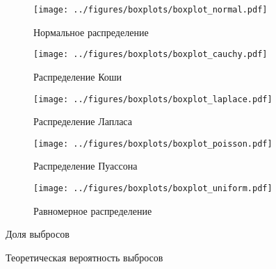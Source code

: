 \documentclass[12pt]{report}
\begin{document}
	\begin{figure}[H]
		\centering
		\texttt{[image: ../figures/boxplots/boxplot\_normal.pdf]}
		\caption{Нормальное распределение}
	\end{figure}
	\begin{figure}[H]
		\centering
		\texttt{[image: ../figures/boxplots/boxplot\_cauchy.pdf]}
		\caption{Распределение Коши}
	\end{figure}
	\begin{figure}[H]
		\centering
		\texttt{[image: ../figures/boxplots/boxplot\_laplace.pdf]}
		\caption{Распределение Лапласа}
	\end{figure}
	\begin{figure}[H]
		\centering
		\texttt{[image: ../figures/boxplots/boxplot\_poisson.pdf]}
		\caption{Распределение Пуассона}
	\end{figure}
	\begin{figure}[H]
		\centering
		\texttt{[image: ../figures/boxplots/boxplot\_uniform.pdf]}
		\caption{Равномерное распределение}
	\end{figure}

	\begin{table}[H]
		\centering
		
		\caption{Доля выбросов}
	\end{table}

	\begin{table}[H]
		\centering
		
		\caption{Теоретическая вероятность выбросов}
	\end{table}
\end{document}
